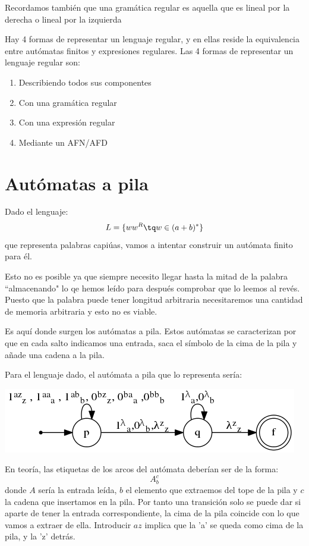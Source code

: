 \documentclass{apuntes}
\begin{document}
Recordamos también que una gramática regular es aquella que es lineal por la derecha o lineal por la izquierda
 
Hay 4 formas de representar un lenguaje regular, y en ellas reside la equivalencia entre autómatas finitos y expresiones regulares. Las 4 formas de representar un lenguaje regular son:
\begin{enumerate}
\item Describiendo todos sus componentes
\item Con una gramática regular
\item Con una expresión regular
\item Mediante un AFN/AFD
\end{enumerate}

\newpage




\chapter{Autómatas a pila}
Dado el lenguaje:
\[L=\lbrace ww^R \tq w \in (a+b)^*\rbrace\]
que representa palabras capiúas, vamos a intentar construir un autómata finito para él.

Esto no es posible ya que siempre necesito llegar hasta la mitad de la palabra ``almacenando" lo qe hemos leído para después comprobar que lo leemos al revés. Puesto que la palabra puede tener longitud arbitraria necesitaremos una cantidad de memoria arbitraria y esto no es viable.

Es aquí donde surgen los autómatas a pila. Estos autómatas se caracterizan por que en cada salto indicamos una entrada, saca el símbolo de la cima de la pila y añade una cadena a la pila.

Para el lenguaje dado, el autómata a pila que lo representa sería:

\begin{center}
\includegraphics[scale=0.75]{automata5.png}
\end{center}
En teoría, las etiquetas de los arcos del autómata deberían ser de la forma:
\[A_b^c\]
donde $A$ sería la entrada leída, $b$ el elemento que extraemos del tope de la pila y $c$ la cadena que insertamos en la pila. Por tanto una transición solo se puede dar si aparte de tener la entrada correspondiente, la cima de la pila coincide con lo que vamos a extraer de ella. Introducir $az$ implica que la 'a' se queda como cima de la pila, y la 'z' detrás.
\end{document}
